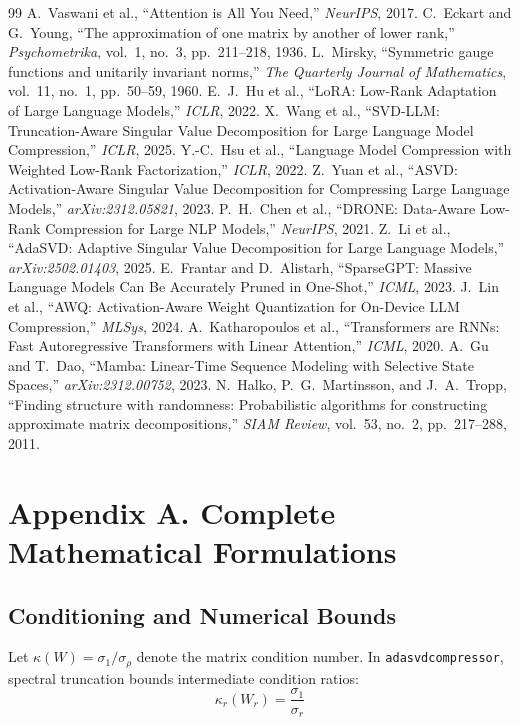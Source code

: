 \documentclass{article}
\begin{document}
\begin{thebibliography}{99}
 A.~Vaswani et al., ``Attention is All You Need,'' \emph{NeurIPS}, 2017.
 C.~Eckart and G.~Young, ``The approximation of one matrix by another of lower rank,'' \emph{Psychometrika}, vol.~1, no.~3, pp.~211--218, 1936.
 L.~Mirsky, ``Symmetric gauge functions and unitarily invariant norms,'' \emph{The Quarterly Journal of Mathematics}, vol.~11, no.~1, pp.~50--59, 1960.
 E.~J.~Hu et al., ``LoRA: Low-Rank Adaptation of Large Language Models,'' \emph{ICLR}, 2022.
 X.~Wang et al., ``SVD-LLM: Truncation-Aware Singular Value Decomposition for Large Language Model Compression,'' \emph{ICLR}, 2025.
 Y.-C.~Hsu et al., ``Language Model Compression with Weighted Low-Rank Factorization,'' \emph{ICLR}, 2022.
 Z.~Yuan et al., ``ASVD: Activation-Aware Singular Value Decomposition for Compressing Large Language Models,'' \emph{arXiv:2312.05821}, 2023.
 P.~H.~Chen et al., ``DRONE: Data-Aware Low-Rank Compression for Large NLP Models,'' \emph{NeurIPS}, 2021.
 Z.~Li et al., ``AdaSVD: Adaptive Singular Value Decomposition for Large Language Models,'' \emph{arXiv:2502.01403}, 2025.
 E.~Frantar and D.~Alistarh, ``SparseGPT: Massive Language Models Can Be Accurately Pruned in One-Shot,'' \emph{ICML}, 2023.
 J.~Lin et al., ``AWQ: Activation-Aware Weight Quantization for On-Device LLM Compression,'' \emph{MLSys}, 2024.
 A.~Katharopoulos et al., ``Transformers are RNNs: Fast Autoregressive Transformers with Linear Attention,'' \emph{ICML}, 2020.
 A.~Gu and T.~Dao, ``Mamba: Linear-Time Sequence Modeling with Selective State Spaces,'' \emph{arXiv:2312.00752}, 2023.
 N.~Halko, P.~G.~Martinsson, and J.~A.~Tropp, ``Finding structure with randomness: Probabilistic algorithms for constructing approximate matrix decompositions,'' \emph{SIAM Review}, vol.~53, no.~2, pp.~217--288, 2011.
\end{thebibliography}


\section*{Appendix A. Complete Mathematical Formulations}

\subsection*{Conditioning and Numerical Bounds}
Let $\kappa(W) = \sigma_1 / \sigma_\rho$ denote the matrix condition number. In \texttt{adasvdcompressor}, spectral truncation bounds intermediate condition ratios:
\[
\kappa_r(W_r) = \frac{\sigma_1}{\sigma_r}
\]
\end{document}
